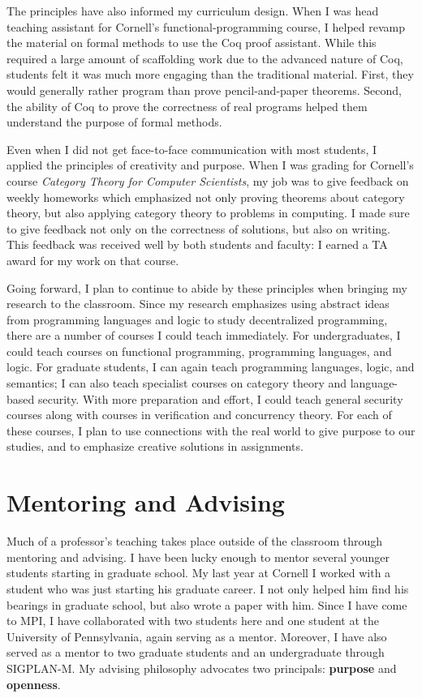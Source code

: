 \documentclass{article}
\theoremstyle{definition}
\begin{document}
The principles have also informed my curriculum design.
When I was head teaching assistant for Cornell's functional-programming course, I helped revamp the material on formal methods to use the Coq proof assistant.
While this required a large amount of scaffolding work due to the advanced nature of Coq, students felt it was much more engaging than the traditional material.
First, they would generally rather program than prove pencil-and-paper theorems.
Second, the ability of Coq to prove the correctness of real programs helped them understand the purpose of formal methods.

Even when I did not get face-to-face communication with most students, I applied the principles of creativity and purpose.
When I was grading for Cornell's course \emph{Category Theory for Computer Scientists}, my job was to give feedback on weekly homeworks which emphasized not only proving theorems about category theory, but also applying category theory to problems in computing.
I made sure to give feedback not only on the correctness of solutions, but also on writing.
This feedback was received well by both students and faculty: I earned a TA award for my work on that course.

Going forward, I plan to continue to abide by these principles when bringing my research to the classroom.
Since my research emphasizes using abstract ideas from programming languages and logic to study decentralized programming, there are a number of courses I could teach immediately.
For undergraduates, I could teach courses on functional programming, programming languages, and logic.
For graduate students, I can again teach programming languages, logic, and semantics; I can also teach specialist courses on category theory and language-based security.
With more preparation and effort, I could teach general security courses along with courses in verification and concurrency theory.
For each of these courses, I plan to use connections with the real world to give purpose to our studies, and to emphasize creative solutions in assignments.

\section*{Mentoring and Advising}

Much of a professor's teaching takes place outside of the classroom through mentoring and advising.
I have been lucky enough to mentor several younger students starting in graduate school.
My last year at Cornell I worked with a student who was just starting his graduate career.
I not only helped him find his bearings in graduate school, but also wrote a paper with him.
Since I have come to MPI, I have collaborated with two students here and one student at the University of Pennsylvania, again serving as a mentor.
Moreover, I have also served as a mentor to two graduate students and an undergraduate through SIGPLAN-M.
My advising philosophy advocates two principals: \textbf{purpose} and \textbf{openness}.
\end{document}
